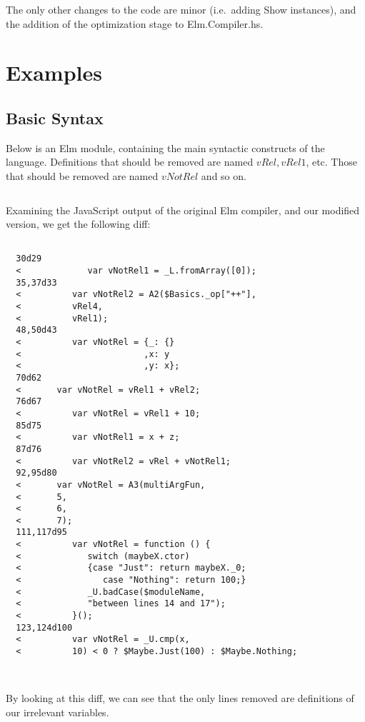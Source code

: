 \documentclass{article}
\begin{document}
The only other changes to the code are minor (i.e.~adding Show instances), and the addition of the optimization stage to Elm.Compiler.hs.

\section{Examples}

\subsection{Basic Syntax}

Below is an Elm module, containing the main syntactic constructs of the language.
Definitions that should be removed are named $vRel, vRel1$, etc. Those that should be removed are named
$vNotRel$ and so on.

\begin{multicols}{2}
\inputminted{elm}{apaTests/SyntaxTest.elm}
\end{multicols}

Examining the JavaScript output of the original Elm compiler, and our modified version,
we get the following diff:


\begin{verbatim}
            
  30d29
  <             var vNotRel1 = _L.fromArray([0]);
  35,37d33
  <          var vNotRel2 = A2($Basics._op["++"],
  <          vRel4,
  <          vRel1);
  48,50d43
  <          var vNotRel = {_: {}
  <                        ,x: y
  <                        ,y: x};
  70d62
  <       var vNotRel = vRel1 + vRel2;
  76d67
  <          var vNotRel = vRel1 + 10;
  85d75
  <          var vNotRel1 = x + z;
  87d76
  <          var vNotRel2 = vRel + vNotRel1;
  92,95d80
  <       var vNotRel = A3(multiArgFun,
  <       5,
  <       6,
  <       7);
  111,117d95
  <          var vNotRel = function () {
  <             switch (maybeX.ctor)
  <             {case "Just": return maybeX._0;
  <                case "Nothing": return 100;}
  <             _U.badCase($moduleName,
  <             "between lines 14 and 17");
  <          }();
  123,124d100
  <          var vNotRel = _U.cmp(x,
  <          10) < 0 ? $Maybe.Just(100) : $Maybe.Nothing;
            
               
\end{verbatim}  

By looking at this diff, we can see that the only lines removed are definitions of our irrelevant variables.          

                    
\end{document}

